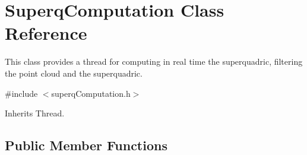 \section{Superq\+Computation Class Reference}
\label{classSuperqComputation}


This class provides a thread for computing in real time the superquadric, filtering the point cloud and the superquadric.  




{\ttfamily \#include $<$superq\+Computation.\+h$>$}



Inherits Thread.

\subsection*{Public Member Functions}
